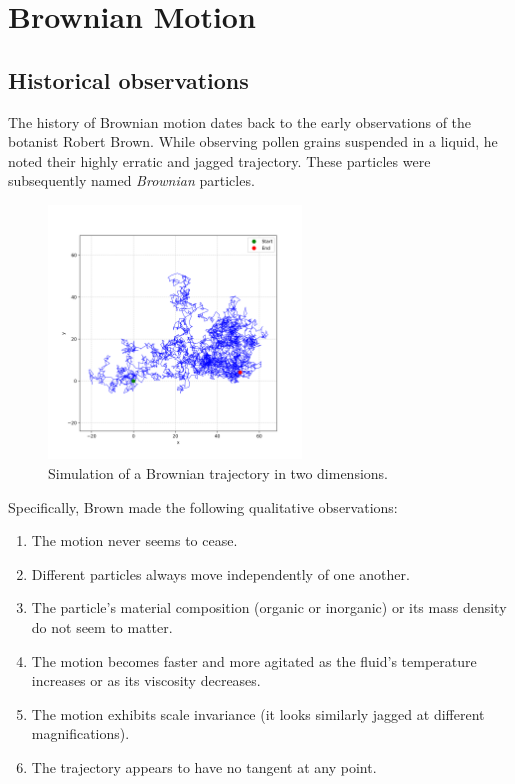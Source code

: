 
\chapter{Brownian Motion}


\section{Historical observations}
The history of Brownian motion dates back to the early observations of the botanist Robert Brown. While observing pollen grains suspended in a liquid, he noted their highly erratic and jagged trajectory. These particles were subsequently named \textit{Brownian} particles.


\begin{figure}[h!]
    \centering
    \includegraphics[width=0.6\textwidth]{images/brownian_motion_2d.png} 
    \caption{Simulation of a Brownian trajectory in two dimensions.}
\end{figure}

Specifically, Brown made the following qualitative observations:
\begin{enumerate}[label=\roman*)]
    \item The motion never seems to cease.
    \item Different particles always move independently of one another.
    \item The particle's material composition (organic or inorganic) or its mass density do not seem to matter.
    \item The motion becomes faster and more agitated as the fluid's temperature increases or as its viscosity decreases.
    \item The motion exhibits scale invariance (it looks similarly jagged at different magnifications).
    \item The trajectory appears to have no tangent at any point.
\end{enumerate}

